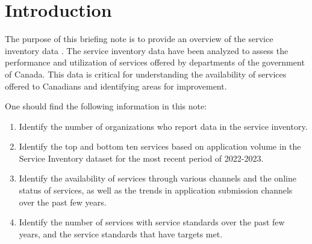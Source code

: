 \section{Introduction}

The purpose of this briefing note is to provide an overview of the service inventory data \cite{cite1}. The service inventory data have been analyzed to assess the performance and utilization of services offered by departments of the government of Canada. This data is critical for understanding the availability of services offered to Canadians and identifying areas for improvement.

One should find the following information in this note: 
\begin{tcolorbox}[title=Key Findings,boxrule=1pt]
    \begin{enumerate}
        \item Identify the number of organizations who report data in the service inventory.

        \item Identify the top and bottom ten services based on application volume in the Service Inventory dataset for the most recent period of 2022-2023.

        \item Identify the availability of services through various channels and the online status of services, as well as the trends in application submission channels over the past few years.

        \item Identify the number of services with service standards over the past few years, and the service standards that have targets met.
    \end{enumerate}
\end{tcolorbox}